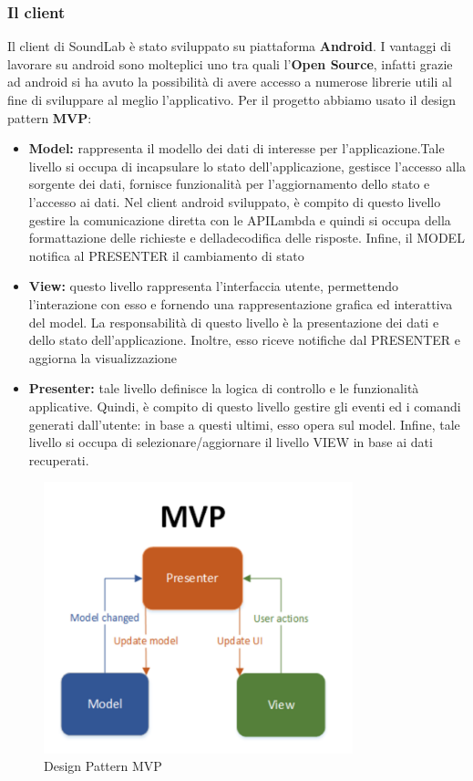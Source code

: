 \documentclass{article}
\begin{document}
		\subsubsection{Il client}
		Il client di SoundLab è stato sviluppato su piattaforma \textbf{Android}. I vantaggi di lavorare su android sono molteplici uno tra quali l’\textbf{Open Source}, infatti grazie ad android si ha avuto la possibilità di avere accesso a numerose librerie utili al fine di sviluppare al meglio l'applicativo.
		Per il progetto abbiamo usato il design pattern \textbf{MVP}:
		\begin{itemize}
			\item \textbf{Model:} rappresenta il modello dei dati di interesse per l’applicazione.Tale livello si occupa di incapsulare lo stato dell’applicazione, gestisce l’accesso alla sorgente dei dati, fornisce funzionalità per l’aggiornamento dello stato e l’accesso ai dati. Nel client android sviluppato, è compito di questo livello gestire la comunicazione diretta con le APILambda e quindi si occupa della formattazione delle richieste e delladecodifica delle risposte. Infine, il MODEL notifica al PRESENTER il cambiamento di stato
			\item \textbf{View:} questo livello rappresenta l’interfaccia utente, permettendo l’interazione con esso e fornendo una rappresentazione grafica ed interattiva del model. La responsabilità di questo livello è la presentazione dei dati e dello stato dell’applicazione. Inoltre, esso riceve notifiche dal PRESENTER e aggiorna la visualizzazione
			\item \textbf{Presenter:} tale livello definisce la logica di controllo e le funzionalità applicative. Quindi, è compito di questo livello gestire gli eventi ed i comandi generati dall’utente: in base a questi ultimi, esso opera sul model. Infine, tale livello si occupa di selezionare/aggiornare il livello VIEW in base ai dati recuperati.
		\end{itemize}
		\begin{figure}[H]
			\centering
			\includegraphics[width=0.8\textwidth]{Immagini/mvp}
			\caption{Design Pattern MVP}
		\end{figure}
		\newpage
\end{document}
